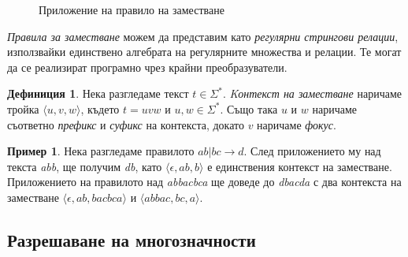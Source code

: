 \documentclass[12pt, oneside]{article}
\theoremstyle{definition}
\newtheorem{definition}{Дефиниция}[section]
\newtheorem{example}{Пример}[section]
\begin{document}
\begin{figure}[!htb]
	\centering
	\caption{Приложение на правило на заместване}
\end{figure}

\emph{Правила за заместване} можем да представим като \emph{регулярни стрингови релации}, използвайки единствено алгебрата на регулярните множества и релации. Те могат да се реализират програмно чрез крайни преобразуватели. \cite{kaplan&kay94}

\begin{definition}
	Нека разгледаме текст \( t \in \Sigma^* \). \emph{Kонтекст на заместване} наричаме тройка \( \langle u,v,w \rangle \), където \( t = uvw \) и \( u, w \in \Sigma^* \). Също така \( u \) и \( w \) наричаме съответно \emph{префикс} и \emph{суфикс} на контекста, докато \( v \) наричаме \emph{фокус}.
\end{definition}

\begin{example}
	Нека разгледаме правилото \( ab|bc \to d \). След приложението му над текста \emph{abb}, ще получим \emph{db}, като \( \langle \epsilon, ab, b \rangle \) е единствения контекст на заместване. Приложението на правилото над \emph{abbacbca} ще доведе до \emph{dbacda} с два контекста на заместване \( \langle \epsilon, ab, bacbca \rangle \) и \( \langle abbac, bc, a \rangle \).
\end{example}

\subsection{Разрешаване на многозначности}
\end{document}
